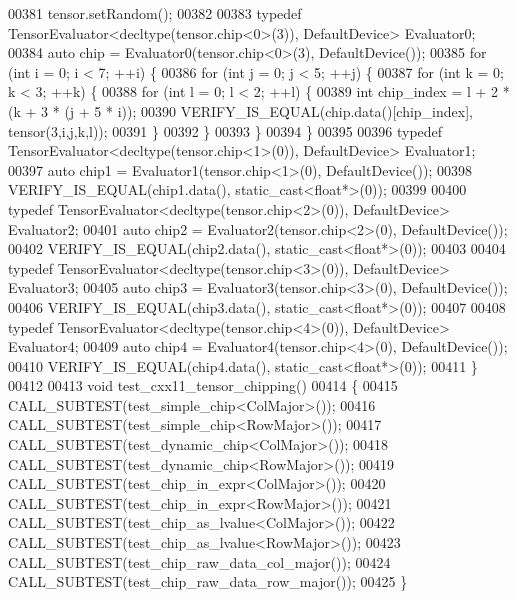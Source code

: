 \begin{DoxyCode}
00381   tensor.setRandom();
00382 
00383   \textcolor{keyword}{typedef} TensorEvaluator<decltype(tensor.chip<0>(3)), DefaultDevice> Evaluator0;
00384   \textcolor{keyword}{auto} chip = Evaluator0(tensor.chip<0>(3), DefaultDevice());
00385   \textcolor{keywordflow}{for} (\textcolor{keywordtype}{int} i = 0; i < 7; ++i) \{
00386     \textcolor{keywordflow}{for} (\textcolor{keywordtype}{int} j = 0; j < 5; ++j) \{
00387       \textcolor{keywordflow}{for} (\textcolor{keywordtype}{int} k = 0; k < 3; ++k) \{
00388         \textcolor{keywordflow}{for} (\textcolor{keywordtype}{int} l = 0; l < 2; ++l) \{
00389           \textcolor{keywordtype}{int} chip\_index = l + 2 * (k + 3 * (j + 5 * i));
00390           VERIFY\_IS\_EQUAL(chip.data()[chip\_index], tensor(3,i,j,k,l));
00391         \}
00392       \}
00393     \}
00394   \}
00395 
00396   \textcolor{keyword}{typedef} TensorEvaluator<decltype(tensor.chip<1>(0)), DefaultDevice> Evaluator1;
00397   \textcolor{keyword}{auto} chip1 = Evaluator1(tensor.chip<1>(0), DefaultDevice());
00398   VERIFY\_IS\_EQUAL(chip1.data(), \textcolor{keyword}{static\_cast<}\textcolor{keywordtype}{float}*\textcolor{keyword}{>}(0));
00399 
00400   \textcolor{keyword}{typedef} TensorEvaluator<decltype(tensor.chip<2>(0)), DefaultDevice> Evaluator2;
00401   \textcolor{keyword}{auto} chip2 = Evaluator2(tensor.chip<2>(0), DefaultDevice());
00402   VERIFY\_IS\_EQUAL(chip2.data(), \textcolor{keyword}{static\_cast<}\textcolor{keywordtype}{float}*\textcolor{keyword}{>}(0));
00403 
00404   \textcolor{keyword}{typedef} TensorEvaluator<decltype(tensor.chip<3>(0)), DefaultDevice> Evaluator3;
00405   \textcolor{keyword}{auto} chip3 = Evaluator3(tensor.chip<3>(0), DefaultDevice());
00406   VERIFY\_IS\_EQUAL(chip3.data(), \textcolor{keyword}{static\_cast<}\textcolor{keywordtype}{float}*\textcolor{keyword}{>}(0));
00407 
00408   \textcolor{keyword}{typedef} TensorEvaluator<decltype(tensor.chip<4>(0)), DefaultDevice> Evaluator4;
00409   \textcolor{keyword}{auto} chip4 = Evaluator4(tensor.chip<4>(0), DefaultDevice());
00410   VERIFY\_IS\_EQUAL(chip4.data(), \textcolor{keyword}{static\_cast<}\textcolor{keywordtype}{float}*\textcolor{keyword}{>}(0));
00411 \}
00412 
00413 \textcolor{keywordtype}{void} test\_cxx11\_tensor\_chipping()
00414 \{
00415   CALL\_SUBTEST(test\_simple\_chip<ColMajor>());
00416   CALL\_SUBTEST(test\_simple\_chip<RowMajor>());
00417   CALL\_SUBTEST(test\_dynamic\_chip<ColMajor>());
00418   CALL\_SUBTEST(test\_dynamic\_chip<RowMajor>());
00419   CALL\_SUBTEST(test\_chip\_in\_expr<ColMajor>());
00420   CALL\_SUBTEST(test\_chip\_in\_expr<RowMajor>());
00421   CALL\_SUBTEST(test\_chip\_as\_lvalue<ColMajor>());
00422   CALL\_SUBTEST(test\_chip\_as\_lvalue<RowMajor>());
00423   CALL\_SUBTEST(test\_chip\_raw\_data\_col\_major());
00424   CALL\_SUBTEST(test\_chip\_raw\_data\_row\_major());
00425 \}
\end{DoxyCode}

